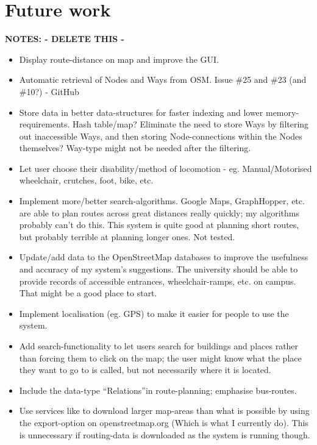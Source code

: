 \section{Future work}
\textbf{NOTES: - DELETE THIS -}
\begin{itemize}
	\item Display route-distance on map and improve the GUI.
	\item Automatic retrieval of Nodes and Ways from OSM.
	\subitem Issue \#25 and \#23 (and \#10?) - GitHub
	\item Store data in better data-structures for faster indexing and lower memory-requirements.
	\subitem Hash table/map?
	\subitem Eliminate the need to store Ways by filtering out inaccessible Ways, and then storing Node-connections within the Nodes themselves? Way-type might not be needed after the filtering.
	\item Let user choose their disability/method of locomotion - eg. Manual/Motorised wheelchair, crutches, foot, bike, etc.
	\item Implement more/better search-algorithms.
	\subitem Google Maps, GraphHopper, etc. are able to plan routes across great distances really quickly; my algorithms probably can't do this.
	\subitem This system is quite good at planning short routes, but probably terrible at planning longer ones. Not tested.
	\item Update/add data to the OpenStreetMap databases to improve the usefulness and accuracy of my system's suggestions.
	\subitem The university should be able to provide records of accessible entrances, wheelchair-ramps, etc. on campus. That might be a good place to start.
	\item Implement localisation (eg. GPS) to make it easier for people to use the system.
	\item Add search-functionality to let users search for buildings and places rather than forcing them to click on the map; the user might know what the place they want to go to is called, but not necessarily where it is located.
	\item Include the data-type \textquotedblleft Relations\textquotedblright in route-planning; emphasise bus-routes.
	\item Use services like \cite{geofabrik,osrm} to download larger map-areas than what is possible by using the export-option on openstreetmap.org (Which is what I currently do).
	\subitem This is unnecessary if routing-data is downloaded as the system is running though.
\end{itemize}

